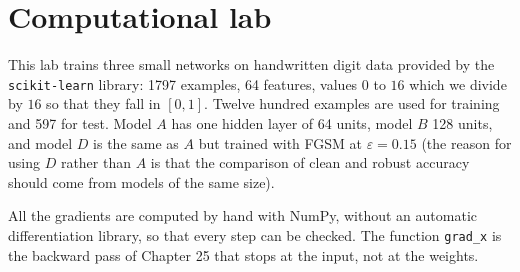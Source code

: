 \section{Computational lab}

This lab trains three small networks on handwritten digit data provided by the
\texttt{scikit-learn} library: 1797 examples, 64 features, values $0$ to $16$ which we
divide by $16$ so that they fall in $[0,1]$. Twelve hundred examples are used for
training and 597 for test. Model $A$ has one hidden layer of 64 units, model $B$ 128
units, and model $D$ is the same as $A$ but trained with FGSM at $\varepsilon=0.15$
(the reason for using $D$ rather than $A$ is that the comparison of clean and robust
accuracy should come from models of the same size).

All the gradients are computed by hand with NumPy, without an automatic differentiation
library, so that every step can be checked. The function \texttt{grad\_x} is the
backward pass of Chapter 25 that stops at the input, not at the weights.

